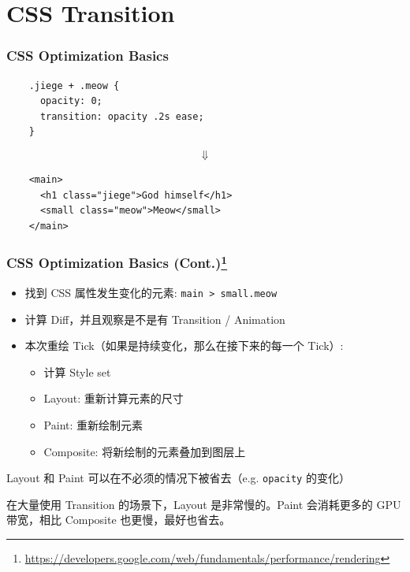 \documentclass[UTF-8]{ctexbeamer}
\begin{document}
\section{CSS Transition}
\begin{frame}[fragile]
  \frametitle{CSS Optimization Basics}
  \begin{verbatim}
    .jiege + .meow {
      opacity: 0;
      transition: opacity .2s ease;
    }
  \end{verbatim}
  \pause
  $$\Downarrow$$
  \begin{verbatim}
    <main>
      <h1 class="jiege">God himself</h1>
      <small class="meow">Meow</small>
    </main>
  \end{verbatim}
\end{frame}

\begin{frame}
  \frametitle{CSS Optimization Basics (Cont.)\footnote{\url{https://developers.google.com/web/fundamentals/performance/rendering}}}

  \begin{itemize}
    \item 找到 CSS 属性发生变化的元素: \texttt{main > small.meow}
    \pause
    \item 计算 Diff，并且观察是不是有 Transition / Animation
    \pause
    \item 本次重绘 Tick（如果是持续变化，那么在接下来的每一个 Tick）:
    \pause
    \begin{itemize}
      \item 计算 Style set
      \item Layout: 重新计算元素的尺寸
      \item Paint: 重新绘制元素
      \item Composite: 将新绘制的元素叠加到图层上
    \end{itemize}
  \end{itemize}

  \pause
  \vspace{2em}

  Layout 和 Paint 可以在不必须的情况下被省去（e.g. \texttt{opacity} 的变化）

  \pause
  \vspace{1em}

  在大量使用 Transition 的场景下，Layout 是非常慢的。Paint 会消耗更多的 GPU 带宽，相比 Composite 也更慢，最好也省去。
\end{frame}
\end{document}
